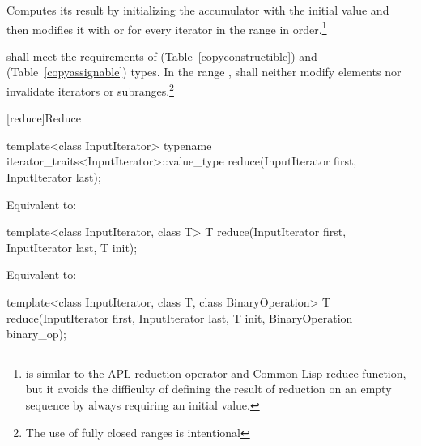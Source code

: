 \begin{itemdescr}
\pnum
\effects
Computes its result by initializing the accumulator
with the initial value
and then modifies it with
or
for every iterator
in the range 
in order.\footnote{
is similar to the APL reduction operator and Common Lisp reduce function, but
it avoids the difficulty of defining the result of reduction on an empty
sequence by always requiring an initial value.}

\pnum
\requires
{} shall meet the requirements of  (Table~\ref{copyconstructible})
and  (Table~\ref{copyassignable}) types.
In the range
,
shall neither modify elements nor invalidate iterators or subranges.\footnote{The use of fully closed ranges is intentional
}
\end{itemdescr}

[reduce]{Reduce}

%
\begin{itemdecl}
template<class InputIterator>
  typename iterator_traits<InputIterator>::value_type
    reduce(InputIterator first, InputIterator last);
\end{itemdecl}

\begin{itemdescr}
\pnum
\effects
Equivalent to: 
\end{itemdescr}

\begin{itemdecl}
template<class InputIterator, class T>
  T reduce(InputIterator first, InputIterator last, T init);
\end{itemdecl}

\begin{itemdescr}
\pnum
\effects
Equivalent to: 
\end{itemdescr}

\begin{itemdecl}
template<class InputIterator, class T, class BinaryOperation>
  T reduce(InputIterator first, InputIterator last, T init,
           BinaryOperation binary_op);
\end{itemdecl}

